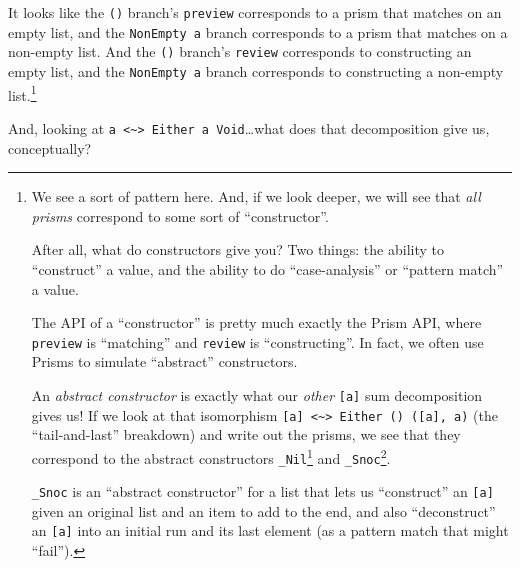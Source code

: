 \documentclass[]{article}
\renewcommand{\href}[2]{#2\footnote{\url{#1}}}
\begin{document}
It looks like the \texttt{()} branch's \texttt{preview} corresponds to a prism
that matches on an empty list, and the \texttt{NonEmpty\ a} branch corresponds
to a prism that matches on a non-empty list. And the \texttt{()} branch's
\texttt{review} corresponds to constructing an empty list, and the
\texttt{NonEmpty\ a} branch corresponds to constructing a non-empty
list.\footnote{We see a sort of pattern here. And, if we look deeper, we will
  see that \emph{all prisms} correspond to some sort of ``constructor''.

  After all, what do constructors give you? Two things: the ability to
  ``construct'' a value, and the ability to do ``case-analysis'' or ``pattern
  match'' a value.

  The API of a ``constructor'' is pretty much exactly the Prism API, where
  \texttt{preview} is ``matching'' and \texttt{review} is ``constructing''. In
  fact, we often use Prisms to simulate ``abstract'' constructors.

  An \emph{abstract constructor} is exactly what our \emph{other}
  \texttt{{[}a{]}} sum decomposition gives us! If we look at that isomorphism
  \texttt{{[}a{]}\ \textless{}\textasciitilde{}\textgreater{}\ Either\ ()\ ({[}a{]},\ a)}
  (the ``tail-and-last'' breakdown) and write out the prisms, we see that they
  correspond to the abstract constructors
  \href{https://github.com/mstksg/inCode/tree/master/code-samples/misc/lenses-and-prisms.hs\#L255-L263}{\texttt{\_Nil}}
  and
  \href{https://github.com/mstksg/inCode/tree/master/code-samples/misc/lenses-and-prisms.hs\#L265-L273}{\texttt{\_Snoc}}.

  \texttt{\_Snoc} is an ``abstract constructor'' for a list that lets us
  ``construct'' an \texttt{{[}a{]}} given an original list and an item to add to
  the end, and also ``deconstruct'' an \texttt{{[}a{]}} into an initial run and
  its last element (as a pattern match that might ``fail'').}

And, looking at
\texttt{a\ \textless{}\textasciitilde{}\textgreater{}\ Either\ a\ Void}\ldots{}what
does that decomposition give us, conceptually?
\end{document}

